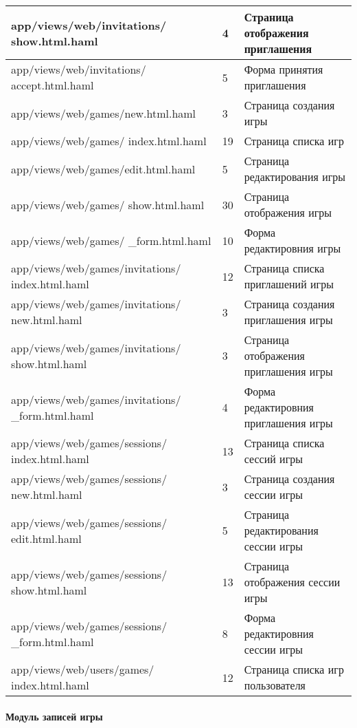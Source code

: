 \begin{longtable}[h]{| p{} | p{} | p{} |}
  \hline
  app/views/web/invitations/ show.html.haml   &   4  &  Страница отображения приглашения \\
  \hline
  app/views/web/invitations/ accept.html.haml   &   5  &  Форма принятия приглашения \\
  \hline
  app/views/web/games/new.html.haml   &   3  &  Страница создания игры \\
  \hline
  app/views/web/games/ index.html.haml   &   19  &  Страница списка игр \\
  \hline
  app/views/web/games/edit.html.haml   &   5  &  Страница редактирования игры \\
  \hline
  app/views/web/games/ show.html.haml   &   30  &  Страница отображения игры\\
  \hline
  app/views/web/games/ \_form.html.haml   &   10  &  Форма редактировния игры \\
  \hline
  app/views/web/games/invitations/ index.html.haml   &   12  &  Страница списка приглашений игры \\
  \hline
  app/views/web/games/invitations/ new.html.haml   &   3  &  Страница создания приглашения игры \\
  \hline
  app/views/web/games/invitations/ show.html.haml   &   3  &  Страница отображения приглашения игры \\
  \hline
  app/views/web/games/invitations/ \_form.html.haml   &   4  &  Форма редактировния приглашения игры \\
  \hline
  app/views/web/games/sessions/ index.html.haml   &   13  &  Страница списка сессий игры \\
  \hline
  app/views/web/games/sessions/ new.html.haml   &   3  &  Страница создания сессии игры \\
  \hline
  app/views/web/games/sessions/ edit.html.haml   &   5  &  Страница редактирования сессии игры \\
  \hline
  app/views/web/games/sessions/ show.html.haml   &   13  &  Страница отображения сессии игры \\
  \hline
  app/views/web/games/sessions/ \_form.html.haml   &   8  &  Форма редактировния сессии игры \\
  \hline
  app/views/web/users/games/ index.html.haml   &   12  &  Страница списка игр пользователя \\
  \hline
\end{longtable}


\paragraph{Модуль записей игры}

